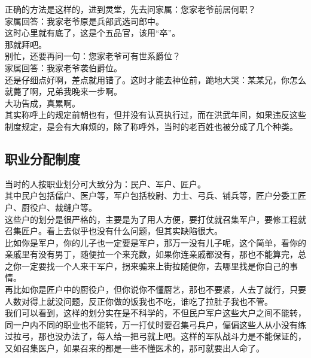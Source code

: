 \begin{multicols}{\theparacolNo}
正确的方法是这样的，进到灵堂，先去问家属：您家老爷前居何职？\\

家属回答：我家老爷原是兵部武选司郎中。\\

这时心里就有底了，这是个五品官，该用“卒”。\\

那就拜吧。\\

别忙，还要再问一句：您家老爷可有世系爵位？\\

家属回答：我家老爷袭伯爵位。\\

还是仔细点好啊，差点就用错了。这时才能去神位前，跪地大哭：某某兄，你怎么就薨了啊，兄弟我晚来一步啊。\\

大功告成，真累啊。\\

其实称呼上的规定前朝也有，但并没有认真执行过，而在洪武年间，如果违反这些制度规定，是会有大麻烦的，除了称呼外，当时的老百姓也被分成了几个种类。\\

\subsection{职业分配制度}
当时的人按职业划分可大致分为：民户、军户、匠户。\\

其中民户包括儒户、医户等，军户包括校尉、力士、弓兵、铺兵等，匠户分委工匠户、厨役户、裁缝户等。\\

这些户的划分是很严格的，主要是为了用人方便，要打仗就召集军户，要修工程就召集匠户。看上去似乎也没有什么问题，但其实缺陷很大。\\

比如你是军户，你的儿子也一定要是军户，那万一没有儿子呢，这个简单，看你的亲戚里有没有男丁，随便拉一个来充数，如果你连亲戚都没有，那也不能算完，总之你一定要找一个人来干军户，拐来骗来上街拉随便你，去哪里找是你自己的事情。\\

再比如你是匠户中的厨役户，但你说你不懂厨艺，那也不要紧，人去了就行，只要人数对得上就没问题，反正你做的饭我也不吃，谁吃了拉肚子我也不管。\\

我们可以看到，这样的划分实在是不科学的，不但民户军户这些大户之间不能转，同一户内不同的职业也不能转，万一打仗时要召集弓兵户，偏偏这些人从小没有练过拉弓，那也没办法了，每人给一把弓就上吧。这样的军队战斗力是不能保证的，又如召集医户，如果召来的都是一些不懂医术的，那可就要出人命了。\\


\end{multicols}
